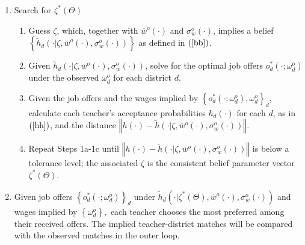 \documentclass[notitlepage,12pt]{article}%
\begin{document}
\begin{enumerate}
\item Search for $\zeta^{\ast}\left(  \Theta\right)  $

\begin{enumerate}
\item Guess $\zeta$,  which, together with $\overline{w}^{o}\left(
\cdot\right)  $ and $\sigma_{w}^{o}\left(  \cdot\right)  $, implies a belief
$\left\{  \widetilde{h}_{d}\left(  \cdot|\zeta,\overline{w}^{o}\left(
\cdot\right)  ,\sigma_{w}^{o}\left(  \cdot\right)  \right)  \right\}  $ as
defined in $\left(  \ref{bb}\right)  $.

\item Given $\widetilde{h}_{d}\left(  \cdot|\zeta,\overline{w}^{o}\left(
\cdot\right)  ,\sigma_{w}^{o}\left(  \cdot\right)  \right)  $, solve for the
optimal job offers $o_{d}^{\ast}\left(  \cdot;\omega_{d}^{o}\right)  $ under
the observed $\omega_{d}^{o}$ for each district $d$.

\item Given the job offers and the wages implied by $\left\{  o_{d}^{\ast
}\left(  \cdot;\omega_{d}^{o}\right)  ,\omega_{d}^{o}\right\}  _{d}$,
calculate each teacher's acceptance probabilities $h_{d}\left(  \cdot\right)
$ for each $d$, as in $\left(  \ref{hh}\right)  $, and the distance
$\left\Vert h\left(  \cdot\right)  -\widetilde{h}\left(  \cdot|\zeta
,\overline{w}^{o}\left(  \cdot\right)  ,\sigma_{w}^{o}\left(  \cdot\right)
\right)  \right\Vert .$

\item Repeat Steps 1a-1c until $\left\Vert h\left(  \cdot\right)
-\widetilde{h}\left(  \cdot|\zeta,\overline{w}^{o}\left(  \cdot\right)
,\sigma_{w}^{o}\left(  \cdot\right)  \right)  \right\Vert $ is below a
tolerance level; the associated $\zeta$ is the consistent belief parameter
vector $\zeta^{\ast}\left(  \Theta\right)  $.
\end{enumerate}

\item Given job offers $\left\{  o_{d}^{\ast}\left(  \cdot;\omega_{d}%
^{o}\right)  \right\}  _{d}$ under $\widetilde{h}_{d}\left(  \cdot|\zeta
^{\ast}\left(  \Theta\right)  ,\overline{w}^{o}\left(  \cdot\right)
,\sigma_{w}^{o}\left(  \cdot\right)  \right)  $ and wages implied by $\left\{
\omega_{d}^{o}\right\}  ,$ each teacher chooses the most preferred among their
received offers. The implied teacher-district matches will be compared with
the observed matches in the outer loop.


\end{enumerate}
\end{document}
